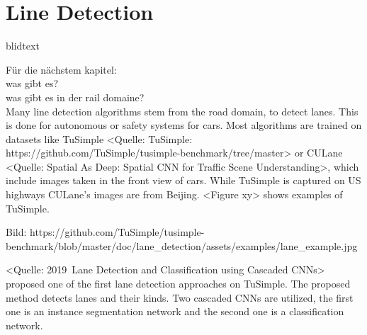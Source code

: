\section{Line Detection}
\label{sec:lineDetection}

blidtext

Für die nächstem kapitel:\\
was gibt es?\\
was gibt es in der rail domaine?\\


Many line detection algorithms stem from the road domain, to detect lanes. This is done for autonomous or safety systems for cars. Most algorithms are trained on datasets like TuSimple <Quelle: TuSimple: https://github.com/TuSimple/tusimple-benchmark/tree/master> or CULane <Quelle: Spatial As Deep: Spatial CNN for Traffic Scene Understanding>, which include images taken in the front view of cars. While TuSimple is captured on US highways CULane's images are from Beijing. <Figure xy> shows examples of TuSimple.

Bild: https://github.com/TuSimple/tusimple-benchmark/blob/master/doc/lane_detection/assets/examples/lane_example.jpg


<Quelle: 2019 Lane Detection and Classification using Cascaded CNNs> proposed one of the first lane detection approaches on TuSimple. The proposed method detects lanes and their kinds. Two cascaded CNNs are utilized, the first one is an instance segmentation network and the second one is a classification network.